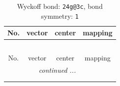 \documentclass[fleqn,8pt]{jsarticle}
\begin{document}
\renewcommand{\arraystretch}{1.2}
\begin{longtable}{cccc}
\caption{Wyckoff bond: {\tt 24g@3c}, bond symmetry: {\tt 1}}
 \\
 \hline \hline
No. & vector & center & mapping \\ \hline \endfirsthead

\multicolumn{3}{l}{\tablename\ \thetable{}} \\
 \hline \hline
No. & vector & center & mapping \\ \hline \endhead

 \hline \hline
\multicolumn{3}{r}{\footnotesize\it continued ...} \\ \endfoot

 \hline \hline
\multicolumn{3}{r}{} \\ \endlastfoot


\end{longtable}
\end{document}

